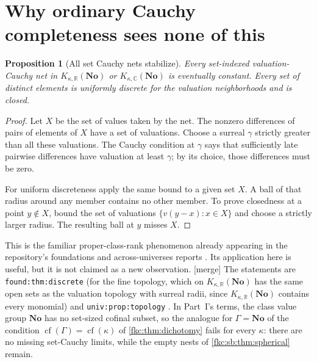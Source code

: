 \documentclass[11pt,letterpaper]{article}
\numberwithin{equation}{section}
\newtheorem{proposition}[theorem]{Proposition}
\theoremstyle{definition}
\theoremstyle{remark}
\newcommand{\R}{\mathbb R}
\newcommand{\C}{\mathbb C}
\newcommand{\No}{\mathbf{No}}
\newcommand{\cf}{\operatorname{cf}}
\newcommand{\mergetag}{\textup{\textsf{\small[merge]}}}%
\newcommand{\KN}[2]{K_{#1,#2}(\No)}%
\newcommand{\lbl}[1]{\nolinkurl{#1}}%
\begin{document}
\section{Why ordinary Cauchy completeness sees none of this}\label{fkc:sb:sec:topology}

\begin{proposition}[All set Cauchy nets stabilize]\label{fkc:sb:prop:cauchy}
Every set-indexed valuation-Cauchy net in $\KN\kappa\R$ or $\KN\kappa\C$ is eventually constant. Every set of distinct elements is uniformly discrete for the valuation neighborhoods and is closed.
\end{proposition}
\begin{proof}
Let $X$ be the set of values taken by the net. The nonzero differences of pairs of elements of $X$ have a set of valuations. Choose a surreal $\gamma$ strictly greater than all these valuations. The Cauchy condition at $\gamma$ says that sufficiently late pairwise differences have valuation at least $\gamma$; by its choice, those differences must be zero.

For uniform discreteness apply the same bound to a given set $X$. A ball of that radius around any member contains no other member. To prove closedness at a point $y\notin X$, bound the set of valuations $\{v(y-x):x\in X\}$ and choose a strictly larger radius. The resulting ball at $y$ misses $X$.
\end{proof}

This is the familiar proper-class-rank phenomenon already appearing in the repository's foundations and across-universes reports \cite{CollUniv}. Its application here is useful, but it is not claimed as a new observation. \mergetag{} The statements are \lbl{found:thm:discrete} \cite{CollFound} (for the fine topology, which on $\KN\kappa\R$ has the same open sets as the valuation topology with surreal radii, since $\KN\kappa\R$ contains every monomial) and \lbl{univ:prop:topology} \cite{CollUniv}. In Part~I's terms, the class value group $\No$ has no set-sized cofinal subset, so the analogue for $\Gamma=\No$ of the condition $\cf(\Gamma)=\cf(\kappa)$ of \cref{fkc:thm:dichotomy} fails for every $\kappa$: there are no missing set-Cauchy limits, while the empty nests of \cref{fkc:sb:thm:spherical} remain.
\end{document}
